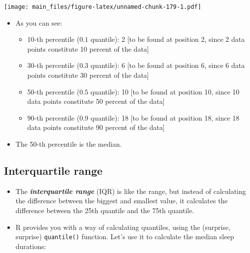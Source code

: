 \documentclass[
]{book}
\newenvironment{Shaded}{\begin{snugshade}}{\end{snugshade}}
\newcommand{\AttributeTok}[1]{\textcolor[rgb]{0.13,0.29,0.53}{#1}}
\newcommand{\DecValTok}[1]{\textcolor[rgb]{0.00,0.00,0.81}{#1}}
\newcommand{\FunctionTok}[1]{\textcolor[rgb]{0.13,0.29,0.53}{\textbf{#1}}}
\newcommand{\NormalTok}[1]{#1}
\newcommand{\SpecialCharTok}[1]{\textcolor[rgb]{0.81,0.36,0.00}{\textbf{#1}}}
\providecommand{\tightlist}{%
  \setlength{\itemsep}{0pt}\setlength{\parskip}{0pt}}
\begin{document}
\texttt{[image: main\_files/figure-latex/unnamed-chunk-179-1.pdf]}

\begin{itemize}
\tightlist
\item
  As you can see:

  \begin{itemize}
  \tightlist
  \item
    10-th percentile (\(0.1\) quantile): 2 {[}to be found at position 2, since 2 data points constitute 10 percent of the data{]}
  \item
    30-th percentile (\(0.3\) quantile): 6 {[}to be found at position 6, since 6 data points constitute 30 percent of the data{]}
  \item
    50-th percentile (\(0.5\) quantile): 10 {[}to be found at position 10, since 10 data points constitute 50 percent of the data{]}
  \item
    90-th percentile (\(0.9\) quantile): 18 {[}to be found at position 18, since 18 data points constitute 90 percent of the data{]}
  \end{itemize}
\item
  The 50-th percentile is the median.
\end{itemize}

\subsection{Interquartile range}\label{interquartile-range}

\begin{itemize}
\tightlist
\item
  The \textbf{\emph{interquartile range}} (IQR) is like the range, but instead of calculating the difference between the biggest and smallest value, it calculates the difference between the 25th quantile and the 75th quantile.
\item
  R provides you with a way of calculating quantiles, using the (surprise, surprise) \texttt{quantile()} function. Let's use it to calculate the median sleep durations:
\end{itemize}

\begin{Shaded}
\end{Shaded}
\end{document}
